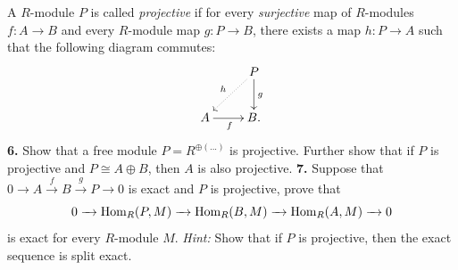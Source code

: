 \documentclass[11pt]{amsart}
\theoremstyle{theorem}
\renewcommand{\to}[1][]{\xrightarrow{\ #1\ }}
\newcommand{\Hom}{\textnormal{Hom}}
\begin{document}
\vskip 250pt
A $R$-module $P$ is called \emph{projective} if for every \emph{surjective} map of $R$-modules $f : A \to B$ and every $R$-module map $g : P \to B$, there exists a map $h : P \to A$ such that the following diagram commutes:
    \[
    \xymatrix{
    & P \ar@{.>}[dl]_{h} \ar[d]^g \\
    A \ar[r]_f & B.
    }
    \]
\noindent
{\bf 6.}    Show that a free module $P = R^{\oplus (...)}$ is projective.  Further show that if $P$ is projective and $P \cong A \oplus B$, then $A$ is also projective.
\vskip 200pt
\noindent
{\bf 7.}  Suppose that $0 \to A \xrightarrow{f} B \xrightarrow{g} P \to 0$ is exact and $P$ is projective, prove that
    \[
    0 \to \Hom_R(P, M) \to \Hom_R(B, M) \to \Hom_R(A, M) \to 0
    \]
    is exact for every $R$-module $M$.
    \vskip 3pt
    \emph{Hint: } Show that if $P$ is projective, then the exact sequence is split exact.
\end{document}
